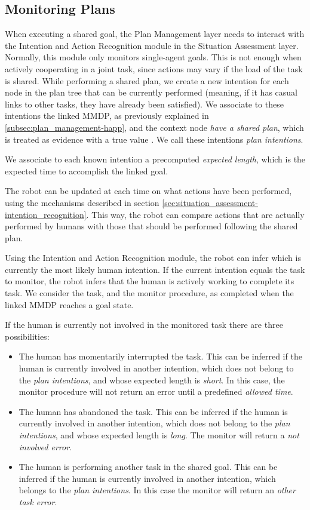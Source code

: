 \subsection{Monitoring Plans}
When executing a shared goal, the Plan Management layer needs to interact with the Intention and Action Recognition module in the Situation Assessment layer. Normally, this module only monitors single-agent goals. This is not enough when actively cooperating in a joint task, since actions may vary if the load of the task is shared. While performing a shared plan, we create a new intention for each node in the plan tree that can be currently performed (meaning, if it has casual links to other tasks, they have already been satisfied). We associate to these intentions the linked MMDP, as previously explained in \ref{subsec:plan_management-happ},
 and the context node \textit{have a shared plan}, which is treated as evidence with a true value . We call these intentions \textit{plan intentions}.

We associate to each known intention a precomputed \textit{expected length}, which is the expected time to accomplish the linked goal.

The robot can be updated at each time on what actions have been performed, using the mechanisms described in section \ref{sec:situation_assessment-intention_recognition}. This way, the robot can compare actions that are actually performed by humans with those that should be performed following the shared plan.

Using the Intention and Action Recognition module, the robot can infer which is currently the most likely human intention. If the current intention equals the task to monitor, the robot infers that the human is actively working to complete its task. We consider the task, and the monitor procedure, as completed when the linked MMDP reaches a goal state.

If the human is currently not involved in the monitored task there are three possibilities:
\begin{itemize}
	\item The human has momentarily interrupted the task. This can be inferred if the human is currently involved in another intention, which does not belong to the \textit{plan intentions}, and whose expected length is \textit{short}. In this case, the monitor procedure will not return an error until a predefined \textit{allowed time}.
	\item The human has abandoned the task.  This can be inferred if the human is currently involved in another intention, which does not belong to the \textit{plan intentions}, and whose expected length is \textit{long}. The monitor will return a \textit{not involved error}. 
	\item The human is performing another task in the shared goal. This can be inferred if the human is currently involved in another intention, which belongs to the \textit{plan intentions}. In this case the monitor will return an \textit{other task error}. 
\end{itemize}



